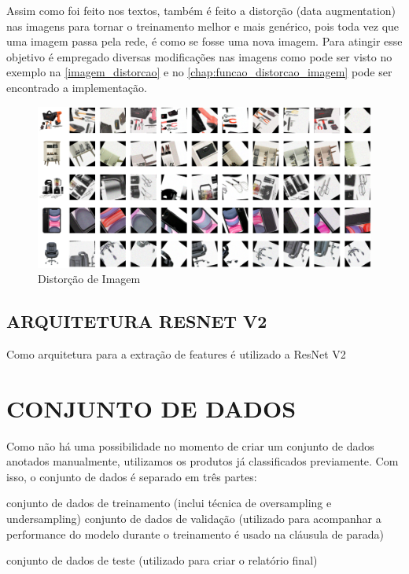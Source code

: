 Assim como foi feito nos textos, também é feito a distorção (data augmentation) nas imagens para tornar o treinamento melhor e mais genérico, pois toda vez que uma imagem passa pela rede, é como se fosse uma nova imagem. Para atingir esse objetivo é empregado diversas modificações nas imagens como pode ser visto no exemplo na \autoref{imagem_distorcao} e no \autoref{chap:funcao_distorcao_imagem} pode ser encontrado a implementação.

\begin{figure}[htb]
	\caption{\label{imagem_distorcao} Distorção de Imagem}
	\begin{center}
	    \includegraphics[width=\textwidth]{artigo/recursos/imagens/imagem_distorcao.png}
	\end{center}
\end{figure}

\subsection{ARQUITETURA RESNET V2}

Como arquitetura para a extração de features é utilizado a ResNet V2 

\section{CONJUNTO DE DADOS}
Como não há uma possibilidade no momento de criar um conjunto de dados anotados manualmente, utilizamos os produtos já classificados previamente.     Com isso, o conjunto de dados é separado em três partes:

conjunto de dados de treinamento (inclui técnica de oversampling e undersampling)
conjunto de dados de validação (utilizado para acompanhar a performance do modelo durante o treinamento é usado na cláusula de parada)

conjunto de dados de teste (utilizado para criar o relatório final)

